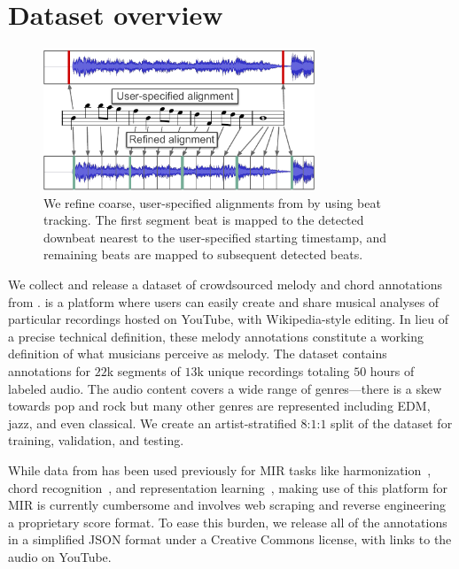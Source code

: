 \section{Dataset overview}
\label{sec:dataset}

\begin{figure}
    \centering
    \includegraphics[width=8.1cm]{figs/alignment.pdf}
    \caption{We refine coarse, user-specified alignments from \hooktheory{} by using beat tracking. The first segment beat is mapped to the detected downbeat nearest to the user-specified starting timestamp, and remaining beats are mapped to subsequent detected beats.}
 \label{fig:alignment}
\end{figure}


We collect and release a dataset of crowdsourced melody and chord annotations from \hooktheory{}. 
\hooktheory{} is a platform where users can easily create and share musical analyses of particular recordings hosted on YouTube, with Wikipedia-style editing. 
In lieu of a precise technical definition, these melody annotations constitute a working definition of what musicians perceive as melody. 
The dataset contains annotations for $22$k segments of $13$k unique recordings totaling $50$ hours of labeled audio. 
The audio content covers a wide range of genres---there is a skew towards pop and rock but many other genres are represented including EDM, jazz, and even classical. 
We create an artist-stratified $8$:$1$:$1$ split of the dataset for training, validation, and testing.

While data from \hooktheory{} has been used previously for MIR tasks like 
harmonization~\cite{chen2021surprisenet,yeh2021automatic}, 
chord recognition~\cite{jiang2019mirex}, and 
representation learning~\cite{jiang2020transformer}, 
making use of this platform for MIR is currently cumbersome and involves web scraping and reverse engineering a proprietary score format. 
To ease this burden, we release all of the annotations in a simplified JSON format under a Creative Commons license, with links to the audio on YouTube.

